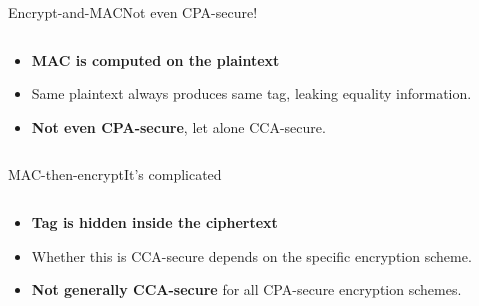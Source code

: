 \documentclass[aspectratio=169, lualatex, handout]{beamer}
\begin{document}
\begin{frame}{Encrypt-and-MAC}{Not even CPA-secure!}
	\begin{columns}[c]
		\begin{column}{0.5\textwidth}
			\begin{itemize}
				\item \textbf{MAC is computed on the plaintext}
				\item Same plaintext always produces same tag, leaking equality information.
				\item \textbf{Not even CPA-secure}, let alone CCA-secure.
			\end{itemize}
		\end{column}
		\begin{column}{0.5\textwidth}
		\end{column}
	\end{columns}
\end{frame}

\begin{frame}{MAC-then-encrypt}{It's complicated}
	\begin{columns}[c]
		\begin{column}{0.5\textwidth}
			\begin{itemize}
				\item \textbf{Tag is hidden inside the ciphertext}
				\item Whether this is CCA-secure depends on the specific encryption scheme.
				\item \textbf{Not generally CCA-secure} for all CPA-secure encryption schemes.
			\end{itemize}
		\end{column}
		\begin{column}{0.5\textwidth}
		\end{column}
	\end{columns}
\end{frame}
\end{document}
